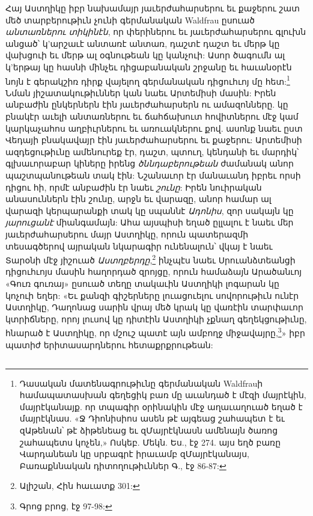 \documentclass{article}
\begin{document}
{Հայ Աստղիկը իբր նախամայր յաւերժահարսերու եւ քաջերու շատ մեծ տարբերութիւն չունի գերմանական Waldfrau ըսուած \emph{անտառներու տիկինէն}, որ փերիներու եւ յաւերժահարսերու գլուխն անցած՝ կ'արշաւէ անտառէ անտառ, դաշտէ դաշտ եւ մերթ կը վախցուի եւ մերթ ալ օգնութեան կը կանչուի: Ասոր ծագումն ալ կ'երթայ կը հասնի մինչեւ դիցաբանական շրջանը եւ հաւանօրէն նոյն է գերակշիռ դիրք վայելող գերմանական դիցուհւոյ մը հետ:\footnote{Դասական մատենագրութիւնը գերմանական Waldfrauի համապատասխան գեղեցիկ բառ մը աւանդած է մէզի մայրէկին, մայրէկանայք. որ տպագիր օրինակին մէջ աղաւաղուած եղած է մայրէկնաս. «Ջ Դիոնիսիոս ասեն թէ այգեաց շահապետ է եւ զԱթենան՝ թէ ձիթենեաց եւ զՄայրէկնասն ամենայն ծառոց շահապետս կոչեն,» Ոսկեբ. Մեկն. Ես., էջ 274. այս եղծ բառը Վարդանեան կը սրբագրէ իրաւամբ զՄայրէկանայս, Բառաքննական դիտողութիւններ Գ., էջ 86-87:} Նման յիշատակութիւններ կան նաեւ Արտեմիսի մասին: Իրեն անբաժին ընկերներն էին յաւերժահարսերն ու ամազոնները. կը բնակէր աւելի անտառներու եւ ճահճախուտ հովիտներու մէջ կամ կարկաչահոս աղբիւրներու եւ առուակներու քով. ասոնք նաեւ ըստ Վեդայի բնակավայր էին յաւերժահարսերու եւ քաջերու: Արտեմիսի ազդեցութիւնը ամենուրեք էր, դաշտ, պտուղ, կենդանի եւ մարդիկ՝ գլխաւորաբար կիները իրենց \emph{ծննդաբերութեան} ժամանակ անոր պաշտպանութեան տակ էին: Նշանաւոր էր մանաւանդ իբրեւ որսի դիցու հի, որմէ անբաժին էր նաեւ \emph{շունը}: Իրեն նուիրական անասուններն էին շունը, արջն եւ վարազը, անոր համար ալ վարազի կերպարանքի տակ կը սպաննէ \emph{Ադոնիս}, զոր սակայն կը \emph{յարուցանէ} միանգամայն: Ահա այսպիսի եղած ըլլալու է նաեւ մեր յաւերժահարսերու մայր Աստղիկը, որուն պատերազմի տեսագծերով այրական նկարագիր ունենալուն՝ վկայ է նաեւ Տարօնի մէջ յիշուած \emph{Աստղբերդը},\footnote{Ալիշան, Հին հաւատք 301:} ինչպէս նաեւ Սրուանձտեանցի դիցուհւոյս մասին հաղորդած զրոյցը, որուն համաձայն Արածանւոյ «Գուռ գուռայ» ըսուած տեղը տակաւին Աստղիկի լոգարան կը կոչուի եղեր: «Եւ քանզի գիշերները լուացուելու սովորութիւն ունէր Աստղիկը, Դաղոնաց սարին վրայ մեծ կրակ կը վառէին տարփաւոր կտրիճները, որոյ լուսով կը դիտէին Աստղիկի չքնաղ գեղեկցութիւնը, հնարած է Աստղիկը, որ մշուշ պատէ այն ամբողջ միջավայրը,\footnote{Գրոց բրոց, էջ 97-98:}» իբր պատիժ երիտասարդներու հետաքրքրութեան:}
\clearpage
\subsection{}
\end{document}
